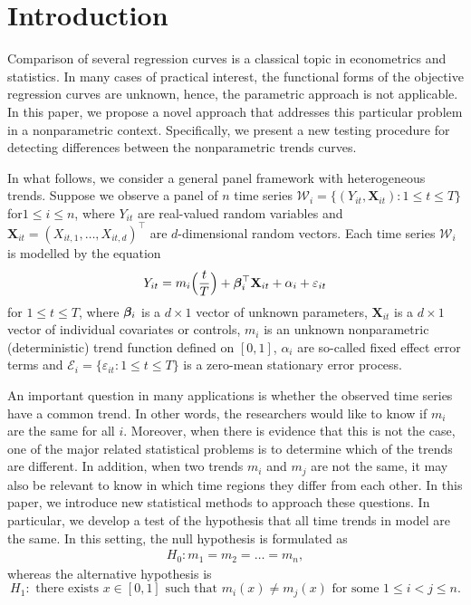 \documentclass[a4paper,12pt]{article}
\makeatletter
\renewcommand{\eqref}[1]{\tagform@{\ref{#1}}}
\makeatother
\begin{document}
%


\section{Introduction}\label{sec:intro}

Comparison of several regression curves is a classical topic in econometrics and statistics. In many cases of practical interest, the functional forms of the objective regression curves are unknown, hence, the parametric approach is not applicable. In this paper, we propose a novel approach that addresses this particular problem in a nonparametric context. Specifically, we present a new testing procedure for detecting differences between the nonparametric trends curves. 

In what follows, we consider a general panel framework with heterogeneous trends. Suppose we observe a panel of $n$ time series $\mathcal{W}_i = \{ (Y_{it},\mathbf{X}_{it}): 1 \le t \le T \}$ for\linebreak $1 \le i \le n$, where $Y_{it}$ are real-valued random variables and $\mathbf{X}_{it} = (X_{it,1},\ldots,X_{it,d})^\top$ are $d$-dimensional random vectors. Each time series $\mathcal{W}_i$ is modelled by the equation
\begin{equation}\label{eq:model}
Y_{it} = m_i \Big( \frac{t}{T} \Big) + \bm{\beta}_i^\top \mathbf{X}_{it} + \alpha_i + \varepsilon_{it}
\end{equation}
for $1 \le t \le T$, where $\bm{\beta}_i$ is a $d \times 1$ vector of unknown parameters, $\mathbf{X}_{it}$ is a $d\times 1$ vector of individual covariates or controls, $m_i$ is an unknown nonparametric (deterministic) trend function defined on $[0,1]$, $\alpha_i$ are so-called fixed effect error terms and \linebreak $\mathcal{E}_i = \{ \varepsilon_{it}: 1 \le t \le T \}$ is a zero-mean stationary error process. 


An important question in many applications is whether the observed time series have a common trend. In other words, the researchers would like to know if $m_i$ are the same for all $i$. Moreover, when there is evidence that this is not the case, one of the major related statistical problems is to determine which of the trends are different.%
In addition, when two trends $m_i$ and $m_j$ are not the same, it may also be relevant to know in which time regions they differ from each other. In this paper, we introduce new statistical methods to approach these questions. In particular, we develop a test of the hypothesis that all time trends in model \eqref{eq:model} are the same. In this setting, the null hypothesis is formulated as 
\begin{align}\label{eq:null}
H_0: m_1 = m_2 = \ldots = m_n,
\end{align}
whereas the alternative hypothesis is 
$$H_1: \text{ there exists } x\in [0, 1] \text{ such that } m_i (x) \neq m_j(x) \text{ for some } 1\leq i < j \leq n.$$
\end{document}
